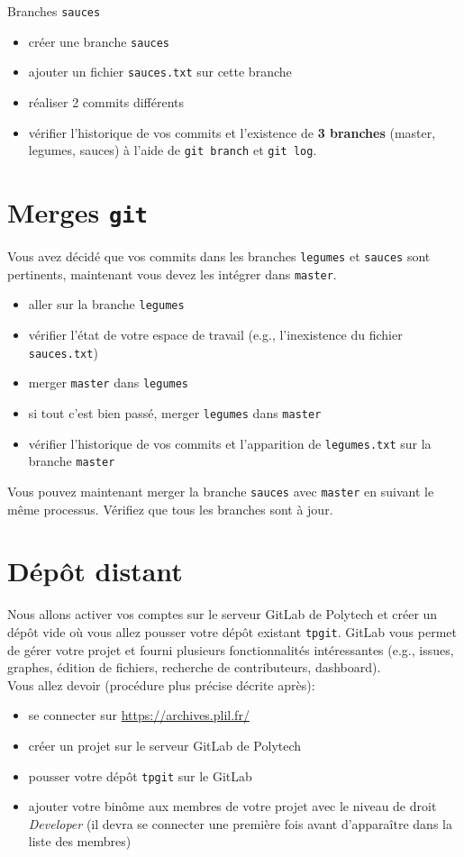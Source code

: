\documentclass[final, a4paper, openbib, ]{article}
\begin{document}
Branches \texttt{sauces}
\begin{itemize}
\item créer une branche \texttt{sauces}
\item ajouter un fichier \texttt{sauces.txt} sur cette branche
\item réaliser 2 commits différents
\item vérifier l'historique de vos commits et l'existence de \textbf{3 branches} (master, legumes, sauces) à l'aide de \texttt{git branch} et \texttt{git log}.
\end{itemize}


\section{Merges \texttt{git}}
Vous avez décidé que vos commits dans les branches \texttt{legumes} et \texttt{sauces} sont pertinents, maintenant vous devez les intégrer dans \texttt{master}.
\begin{itemize}
\item aller sur la branche \texttt{legumes}
\item vérifier l'état de votre espace de travail (e.g., l'inexistence du fichier \texttt{sauces.txt})
\item merger \texttt{master} dans \texttt{legumes}
\item si tout c'est bien passé, merger \texttt{legumes} dans \texttt{master}
\item vérifier l'historique de vos commits et l'apparition de \texttt{legumes.txt} sur la branche \texttt{master}\\
\end{itemize}

Vous pouvez maintenant merger la branche \texttt{sauces} avec \texttt{master} en suivant le même processus.
Vérifiez que tous les branches sont à jour.

\section{Dépôt distant}

Nous allons activer vos comptes sur le serveur GitLab de Polytech et créer un dépôt vide où vous allez pousser votre dépôt existant \texttt{tpgit}.
GitLab vous permet de gérer votre projet et fourni plusieurs fonctionnalités intéressantes (e.g., issues, graphes, édition de fichiers, recherche de contributeurs, dashboard).\\

Vous allez devoir (procédure plus précise décrite après):
\begin{itemize}
\item se connecter sur \url{https://archives.plil.fr/}
\item créer un projet sur le serveur GitLab de Polytech
\item pousser votre dépôt \texttt{tpgit} sur le GitLab
\item ajouter votre binôme aux membres de votre projet avec le niveau de droit \textit{Developer} (il devra se connecter une première fois avant d'apparaître dans la liste des membres)
\end{itemize}
\end{document}
